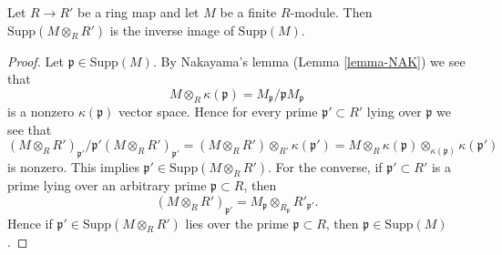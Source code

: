 \begin{lemma}
\label{lemma-support-base-change}
Let $R \to R'$ be a ring map and let $M$ be a finite $R$-module.
Then $\text{Supp}(M \otimes_R R')$ is the inverse image of
$\text{Supp}(M)$.
\end{lemma}

\begin{proof}
Let $\mathfrak p \in \text{Supp}(M)$. By Nakayama's lemma
(Lemma \ref{lemma-NAK}) we see that
$$
M \otimes_R \kappa(\mathfrak p) = M_\mathfrak p/\mathfrak p M_\mathfrak p
$$
is a nonzero $\kappa(\mathfrak p)$ vector space.
Hence for every prime $\mathfrak p' \subset R'$ lying
over $\mathfrak p$ we see that
$$
(M \otimes_R R')_{\mathfrak p'}/\mathfrak p' (M \otimes_R R')_{\mathfrak p'} =
(M \otimes_R R') \otimes_{R'} \kappa(\mathfrak p') =
M \otimes_R \kappa(\mathfrak p) \otimes_{\kappa(\mathfrak p)}
\kappa(\mathfrak p')
$$
is nonzero. This implies $\mathfrak p' \in \text{Supp}(M \otimes_R R')$.
For the converse, if $\mathfrak p' \subset R'$ is a prime lying
over an arbitrary prime $\mathfrak p \subset R$, then
$$
(M \otimes_R R')_{\mathfrak p'} =
M_\mathfrak p \otimes_{R_\mathfrak p} R'_{\mathfrak p'}.
$$
Hence if $\mathfrak p' \in \text{Supp}(M \otimes_R R')$
lies over the prime $\mathfrak p \subset R$, then
$\mathfrak p \in \text{Supp}(M)$.
\end{proof}